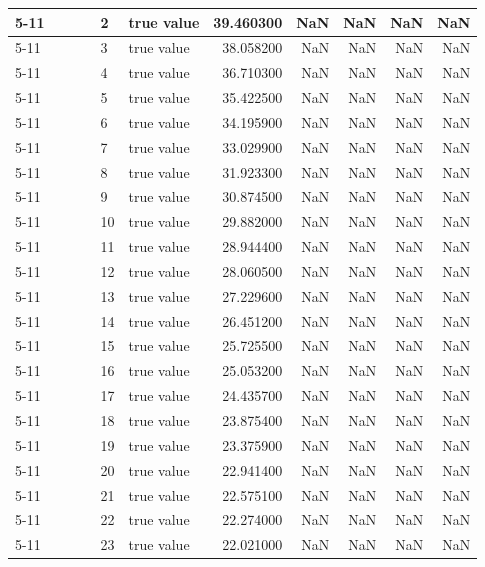 \begin{tabular}{llllllrrrrr}
\cline{5-11}
 &  &  &  & 2 & true value & 39.460300 & NaN & NaN & NaN & NaN \\
\cline{5-11}
 &  &  &  & 3 & true value & 38.058200 & NaN & NaN & NaN & NaN \\
\cline{5-11}
 &  &  &  & 4 & true value & 36.710300 & NaN & NaN & NaN & NaN \\
\cline{5-11}
 &  &  &  & 5 & true value & 35.422500 & NaN & NaN & NaN & NaN \\
\cline{5-11}
 &  &  &  & 6 & true value & 34.195900 & NaN & NaN & NaN & NaN \\
\cline{5-11}
 &  &  &  & 7 & true value & 33.029900 & NaN & NaN & NaN & NaN \\
\cline{5-11}
 &  &  &  & 8 & true value & 31.923300 & NaN & NaN & NaN & NaN \\
\cline{5-11}
 &  &  &  & 9 & true value & 30.874500 & NaN & NaN & NaN & NaN \\
\cline{5-11}
 &  &  &  & 10 & true value & 29.882000 & NaN & NaN & NaN & NaN \\
\cline{5-11}
 &  &  &  & 11 & true value & 28.944400 & NaN & NaN & NaN & NaN \\
\cline{5-11}
 &  &  &  & 12 & true value & 28.060500 & NaN & NaN & NaN & NaN \\
\cline{5-11}
 &  &  &  & 13 & true value & 27.229600 & NaN & NaN & NaN & NaN \\
\cline{5-11}
 &  &  &  & 14 & true value & 26.451200 & NaN & NaN & NaN & NaN \\
\cline{5-11}
 &  &  &  & 15 & true value & 25.725500 & NaN & NaN & NaN & NaN \\
\cline{5-11}
 &  &  &  & 16 & true value & 25.053200 & NaN & NaN & NaN & NaN \\
\cline{5-11}
 &  &  &  & 17 & true value & 24.435700 & NaN & NaN & NaN & NaN \\
\cline{5-11}
 &  &  &  & 18 & true value & 23.875400 & NaN & NaN & NaN & NaN \\
\cline{5-11}
 &  &  &  & 19 & true value & 23.375900 & NaN & NaN & NaN & NaN \\
\cline{5-11}
 &  &  &  & 20 & true value & 22.941400 & NaN & NaN & NaN & NaN \\
\cline{5-11}
 &  &  &  & 21 & true value & 22.575100 & NaN & NaN & NaN & NaN \\
\cline{5-11}
 &  &  &  & 22 & true value & 22.274000 & NaN & NaN & NaN & NaN \\
\cline{5-11}
 &  &  &  & 23 & true value & 22.021000 & NaN & NaN & NaN & NaN \\

\end{tabular}

